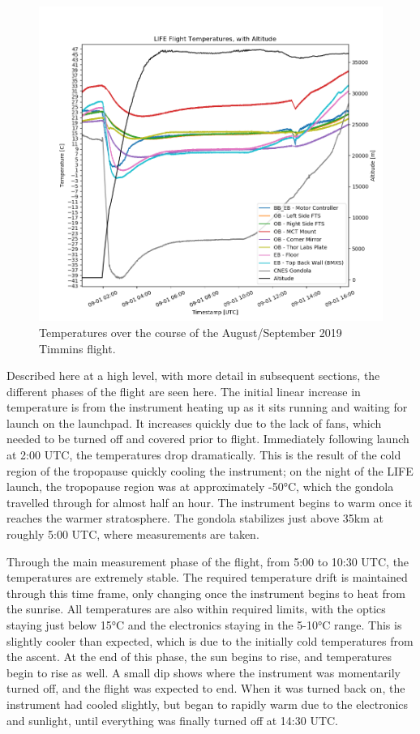 \begin{figure}
    \centering
    \includegraphics[width=\textwidth]{chap4_images/Flight_temp_values_no_sims_V2.png}
    \caption{Temperatures over the course of the August/September 2019 Timmins flight.}
    \label{fig:full_temps_no_sims}
\end{figure}

Described here at a high level, with more detail in subsequent sections, the different phases of the flight are seen here. The initial linear increase in temperature is from the instrument heating up as it sits running and waiting for launch on the launchpad. It increases quickly due to the lack of fans, which needed to be turned off and covered prior to flight. Immediately following launch at 2:00 UTC, the temperatures drop dramatically. This is the result of the cold region of the tropopause quickly cooling the instrument; on the night of the LIFE launch, the tropopause region was at approximately -50°C, which the gondola travelled through for almost half an hour. The instrument begins to warm once it reaches the warmer stratosphere. The gondola stabilizes just above 35km at roughly 5:00 UTC, where measurements are taken.

Through the main measurement phase of the flight, from 5:00 to 10:30 UTC, the temperatures are extremely stable. The required temperature drift is maintained through this time frame, only changing once the instrument begins to heat from the sunrise. All temperatures are also within required limits, with the optics staying just below 15°C and the electronics staying in the 5-10°C range. This is slightly cooler than expected, which is due to the initially cold temperatures from the ascent. At the end of this phase, the sun begins to rise, and temperatures begin to rise as well. A small dip shows where the instrument was momentarily turned off, and the flight was expected to end. When it was turned back on, the instrument had cooled slightly, but began to rapidly warm due to the electronics and sunlight, until everything was finally turned off at 14:30 UTC. 

